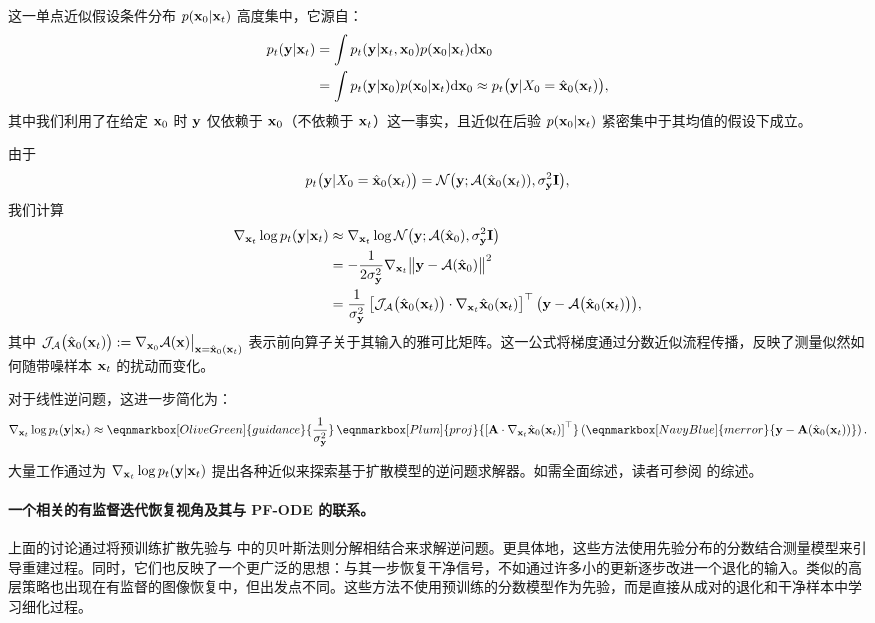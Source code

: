 这一单点近似假设条件分布 $p({\mathbf{x}}_0|{\mathbf{x}}_t)$ 高度集中，它源自：
\begin{align*}
  p_t({\mathbf{y}}|{\mathbf{x}}_t)
  &= \int p_t({\mathbf{y}}|{\mathbf{x}}_t, {\mathbf{x}}_0)  p({\mathbf{x}}_0|{\mathbf{x}}_t)  \mathrm{d}{\mathbf{x}}_0 \\
  &= \int p_t({\mathbf{y}}|{\mathbf{x}}_0)  p({\mathbf{x}}_0|{\mathbf{x}}_t)  \mathrm{d}{\mathbf{x}}_0
   \approx  p_t\bigl({\mathbf{y}}|X_0=\hat{{\mathbf{x}}}_0({\mathbf{x}}_t)\bigr),
\end{align*}
其中我们利用了在给定 ${\mathbf{x}}_0$ 时 ${\mathbf{y}}$ 仅依赖于 ${\mathbf{x}}_0$（不依赖于 ${\mathbf{x}}_t$）这一事实，且近似在后验 $p({\mathbf{x}}_0|{\mathbf{x}}_t)$ 紧密集中于其均值的假设下成立。

由于
\[
  p_t\bigl({\mathbf{y}}|X_0 = \hat{{\mathbf{x}}}_0({\mathbf{x}}_t)\bigr)
  = \mathcal{N}\bigl({\mathbf{y}};  \mathcal{A}(\hat{{\mathbf{x}}}_0({\mathbf{x}}_t)),  \sigma_{{\mathbf{y}}}^2 {\mathbf{I}}\bigr),
\]
我们计算
\begin{align*}
  \nabla_{{\mathbf{x}}_t} \log p_t({\mathbf{y}}|{\mathbf{x}}_t)
  &\approx \nabla_{{\mathbf{x}}_t} \log \mathcal{N}\bigl({\mathbf{y}};  \mathcal{A}(\hat{{\mathbf{x}}}_0),  \sigma_{{\mathbf{y}}}^2 {\mathbf{I}}\bigr) \\
  &= -\frac{1}{2\sigma_{{\mathbf{y}}}^2}  \nabla_{{\mathbf{x}}_t} \bigl\| {\mathbf{y}} - \mathcal{A}(\hat{{\mathbf{x}}}_0) \bigr\|^2 \quad  \\
  &= \frac{1}{\sigma_{{\mathbf{y}}}^2}  \left[ \mathcal{J}_{\mathcal{A}}\big(\hat{{\mathbf{x}}}_0({\mathbf{x}}_t)\big) \cdot \nabla_{{\mathbf{x}}_t} \hat{{\mathbf{x}}}_0({\mathbf{x}}_t) \right]^\top \bigl( {\mathbf{y}} - \mathcal{A}\big(\hat{{\mathbf{x}}}_0({\mathbf{x}}_t)\big) \bigr),
\end{align*}
其中 $\mathcal{J}_{\mathcal{A}}\big(\hat{{\mathbf{x}}}_0({\mathbf{x}}_t)\big) := \nabla_{{\mathbf{x}}_0} \mathcal{A}({\mathbf{x}}) \big|_{{\mathbf{x}} = \hat{{\mathbf{x}}}_0({\mathbf{x}}_t)}$ 表示前向算子关于其输入的雅可比矩阵。这一公式将梯度通过分数近似流程传播，反映了测量似然如何随带噪样本 ${\mathbf{x}}_t$ 的扰动而变化。

对于线性逆问题，这进一步简化为：
\begin{align*}
    \nabla_{\rvx_t} \log p_t(\rvy | \rvx_t) \approx \eqnmarkbox[OliveGreen]{guidance}{\frac{1}{\sigma_{\rvy}^2}}  \,  \eqnmarkbox[Plum]{proj}{\left[ \rmA \cdot \nabla_{\rvx_t} \hat\rvx_0(\rvx_t) \right]^\top} \left(\eqnmarkbox[NavyBlue]{merror}{\rvy - \rmA(\hat\rvx_0(\rvx_t))}\right).
\end{align*}

大量工作通过为 $\nabla_{{\mathbf{x}}_t} \log p_t({\mathbf{y}} | {\mathbf{x}}_t)$ 提出各种近似来探索基于扩散模型的逆问题求解器。如需全面综述，读者可参阅 \citet{daras2024survey} 的综述。



\paragraph{一个相关的有监督迭代恢复视角及其与 PF-ODE 的联系。}
上面的讨论通过将预训练扩散先验与  中的贝叶斯法则分解相结合来求解逆问题。更具体地，这些方法使用先验分布的分数结合测量模型来引导重建过程。同时，它们也反映了一个更广泛的思想：与其一步恢复干净信号，不如通过许多小的更新逐步改进一个退化的输入。类似的高层策略也出现在有监督的图像恢复中，但出发点不同。这些方法不使用预训练的分数模型作为先验，而是直接从成对的退化和干净样本中学习细化过程。

